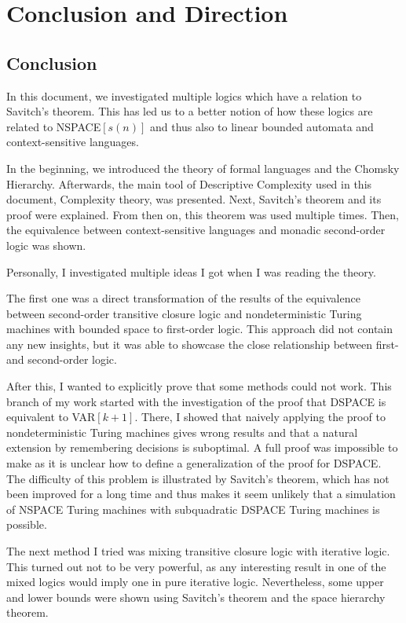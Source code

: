 
\chapter{Conclusion and Direction}\label{ch:conclusion-and-direction}

\section{Conclusion}\label{sec:conclusion}
In this document, we investigated multiple logics which have a relation to Savitch's theorem.  %
This has led us to a better notion of how these logics are related to NSPACE$[s(n)]$ and thus also to linear bounded automata and context-sensitive languages.

In the beginning, we introduced the theory of formal languages and the Chomsky Hierarchy.
Afterwards, the main tool of Descriptive Complexity used in this document, Complexity theory, was presented.
Next, Savitch's theorem and its proof were explained.
From then on, this theorem was used multiple times.
Then, the equivalence between context-sensitive languages and monadic second-order logic was shown.

Personally, I investigated multiple ideas I got when I was reading the theory.

The first one was a direct transformation of the results of the equivalence between second-order transitive closure logic and nondeterministic Turing machines with bounded space to first-order logic.
This approach did not contain any new insights, but it was able to showcase the close relationship between first- and second-order logic.

After this, I wanted to explicitly prove that some methods could not work.
This branch of my work started with the investigation of the proof that DSPACE is equivalent to VAR$[k + 1]$.
There, I showed that naively applying the proof to nondeterministic Turing machines gives wrong results and that a natural extension by remembering decisions is suboptimal.
A full proof was impossible to make as it is unclear how to define a generalization of the proof for DSPACE\@.
The difficulty of this problem is illustrated by Savitch's theorem, which has not been improved for a long time and thus makes it seem unlikely that a simulation of NSPACE Turing machines with subquadratic DSPACE Turing machines is possible.

The next method I tried was mixing transitive closure logic with iterative logic.
This turned out not to be very powerful, as any interesting result in one of the mixed logics would imply one in pure iterative logic.
Nevertheless, some upper and lower bounds were shown using Savitch's theorem and the space hierarchy theorem.

